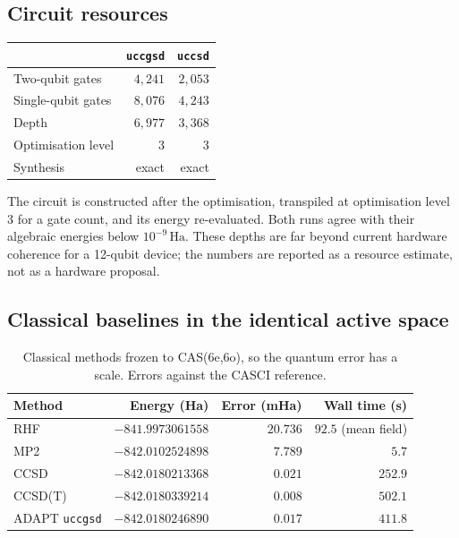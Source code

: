 \documentclass[11pt,a4paper]{article}
\newcommand{\Ha}{\ensuremath{\,\mathrm{Ha}}}
\newcommand{\code}[1]{\texttt{\small #1}}
\begin{document}
\subsection{Circuit resources}

\begin{center}
\small
\begin{tabular}{lrr}
\toprule
& \code{uccgsd} & \code{uccsd} \\
\midrule
Two-qubit gates    & $4{,}241$ & $2{,}053$ \\
Single-qubit gates & $8{,}076$ & $4{,}243$ \\
Depth              & $6{,}977$ & $3{,}368$ \\
Optimisation level & $3$       & $3$ \\
Synthesis          & exact     & exact \\
\bottomrule
\end{tabular}
\end{center}

The circuit is constructed after the optimisation, transpiled at optimisation
level 3 for a gate count, and its energy re-evaluated. Both runs agree with
their algebraic energies below $10^{-9}\Ha$. These depths are far beyond current
hardware coherence for a 12-qubit device; the numbers are reported as a resource
estimate, not as a hardware proposal.

\subsection{Classical baselines in the identical active space}

\begin{table}[htbp]
\centering
\caption{Classical methods frozen to CAS(6e,6o), so the quantum error has a
scale. Errors against the CASCI reference.}
\label{tab:classical}
\small
\begin{tabular}{lrrr}
\toprule
Method & Energy (Ha) & Error (mHa) & Wall time (s) \\
\midrule
RHF        & $-841.9973061558$ & $20.736$ & $92.5$ (mean field) \\
MP2        & $-842.0102524898$ & $7.789$  & $5.7$ \\
CCSD       & $-842.0180213368$ & $0.021$  & $252.9$ \\
CCSD(T)    & $-842.0180339214$ & $\mathbf{0.008}$ & $502.1$ \\
\midrule
ADAPT \code{uccgsd} & $-842.0180246890$ & $0.017$ & $411.8$ \\
\bottomrule
\end{tabular}
\end{table}
\end{document}
